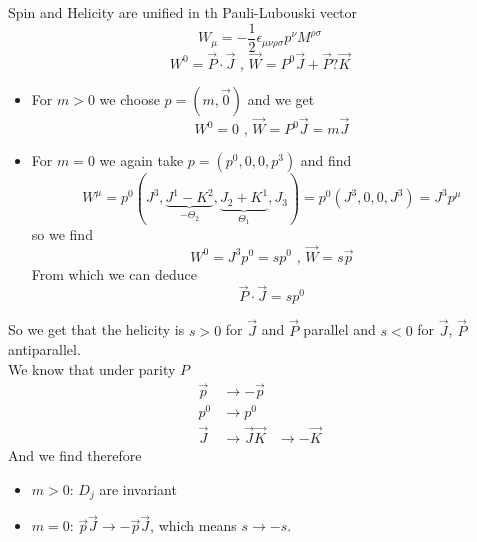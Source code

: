 \documentclass{report}
\begin{document}
Spin and Helicity are unified in th Pauli-Lubouski vector \[
  W_\mu = -\frac{1}{2} \epsilon_{\mu \nu \rho \sigma} p^\nu M^{\rho \sigma}
\] \[
W^0 = \vec{P} \cdot \vec{J} \text{   ,   } \vec{W} = P^0 \vec{J} + \vec{P} ? \vec{K}
\] 
\begin{itemize}
  \item For $m > 0$ we choose $p = \left( m, \vec{0} \right) $ and we get \[
  W^0 = 0 \text{   ,   } \vec{W} = P^0 \vec{J} = m \vec{J}
  \] 
\item For $m = 0$ we again take $p = \left( p^0, 0,0, p^3 \right) $ and find \[
    W^\mu = p^0 \left( J^3, \underbrace{J^1 - K^2}_{-\Theta_2}, \underbrace{J_2 + K^1}_{\Theta_1}, J_3 \right) = p^0 \left( J^3, 0,0, J^3 \right) = J^3 p^\mu
\] so we find \[
W^0 = J^3 p^0 = s p^0 \text{   ,   } \vec{W} = s \vec{p}
\] From which we can deduce \[
\vec{P} \cdot \vec{J} = s p^0
\] 
\end{itemize}
So we get that the helicity is $s>0$ for $\vec{J}$ and $\vec{P}$ parallel and $s<0$ for $\vec{J}$, $\vec{P}$ antiparallel.\\
We know that under parity $P$ 
\begin{align*}
  \vec{p} &\to -\vec{p}\\
  p^0 &\to p^0 \\
  \vec{J} &\to \vec{J}
  \vec{K} &\to - \vec{K}
\end{align*}
And we find therefore 
\begin{itemize}
  \item $m > 0$: $D_j$ are invariant
  \item $m=0$: $\vec{p} \vec{J} \to  - \vec{p} \vec{J}$, which means $s \to  -s$.
\end{itemize}
\end{document}
